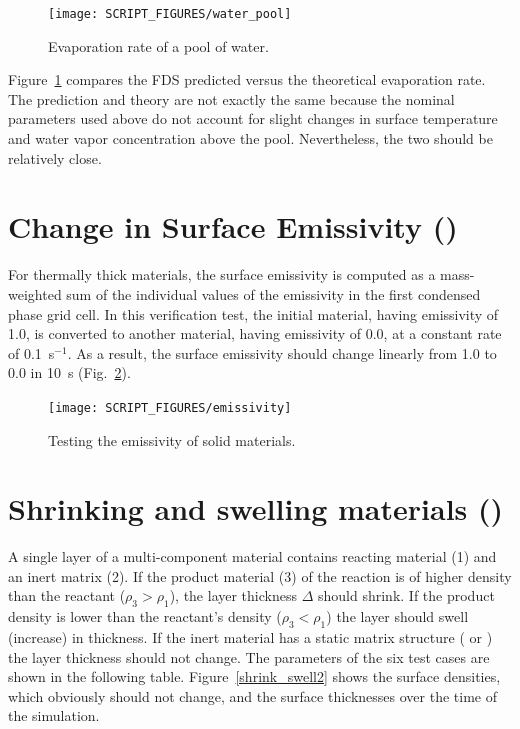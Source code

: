 \documentclass[11pt]{book}
\begin{document}
\begin{figure}[!ht]
\centering
\texttt{[image: SCRIPT\_FIGURES/water\_pool]}
\caption[The  test case]{Evaporation rate of a pool of water.}
\label{water_pool_fig}
\end{figure}

Figure~\ref{water_pool_fig} compares the FDS predicted versus the theoretical evaporation rate. The prediction and theory are not exactly the same because the nominal parameters used above do not account for slight changes in surface temperature and water vapor concentration above the pool. Nevertheless, the two should be relatively close.

\FloatBarrier


\section{Change in Surface Emissivity (\texorpdfstring{}{emissivity})}

For thermally thick materials, the surface emissivity is computed as a mass-weighted sum of the individual values of the emissivity in the first condensed phase grid cell. In this verification test, the initial material, having emissivity of 1.0, is converted to another material, having emissivity of 0.0, at a constant rate of 0.1~s$^{-1}$. As a result, the surface emissivity should change linearly from 1.0 to 0.0 in 10~s (Fig.~\ref{emissivity}).

\begin{figure}[!htb]
\centering
\texttt{[image: SCRIPT\_FIGURES/emissivity]}
\caption[The  test case]{Testing the emissivity of solid materials.}
\label{emissivity}
\end{figure}




\section{Shrinking and swelling materials (\texorpdfstring{}{shrink\_swell})}
\label{shrink_swell}

A single layer of a multi-component material contains reacting material (1) and an inert matrix (2). If the product material (3) of the reaction is of higher density than the reactant ($\rho_3 > \rho_1$), the layer thickness $\Delta$ should shrink. If the product density is lower than the reactant's density ($\rho_3 < \rho_1$) the layer should swell (increase) in thickness. If the inert material has a static matrix structure ( or ) the layer thickness should not change. The parameters of the six test cases are shown in the following table. Figure~\ref{shrink_swell2} shows the surface densities, which obviously should not change, and the surface thicknesses over the time of the simulation.
\end{document}
